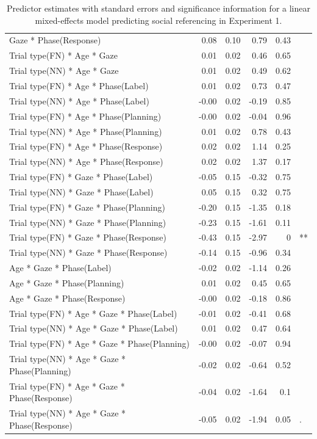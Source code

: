 \documentclass[a4paper,man,apacite,floatsintext]{apa6}
\begin{document}
\begin{table}[b]
\begin{tabular}{lrrrrl}
  Gaze * Phase(Response) & 0.08 & 0.10 & 0.79 & 0.43 &  \\ 
  Trial type(FN) * Age * Gaze & 0.01 & 0.02 & 0.46 & 0.65 &  \\ 
  Trial type(NN) * Age * Gaze & 0.01 & 0.02 & 0.49 & 0.62 &  \\ 
  Trial type(FN) * Age * Phase(Label) & 0.01 & 0.02 & 0.73 & 0.47 &  \\ 
  Trial type(NN) * Age * Phase(Label) & -0.00 & 0.02 & -0.19 & 0.85 &  \\ 
  Trial type(FN) * Age * Phase(Planning) & -0.00 & 0.02 & -0.04 & 0.96 &  \\ 
  Trial type(NN) * Age * Phase(Planning) & 0.01 & 0.02 & 0.78 & 0.43 &  \\ 
  Trial type(FN) * Age * Phase(Response) & 0.02 & 0.02 & 1.14 & 0.25 &  \\ 
  Trial type(NN) * Age * Phase(Response) & 0.02 & 0.02 & 1.37 & 0.17 &  \\ 
  Trial type(FN) * Gaze * Phase(Label) & -0.05 & 0.15 & -0.32 & 0.75 &  \\ 
  Trial type(NN) * Gaze * Phase(Label) & 0.05 & 0.15 & 0.32 & 0.75 &  \\ 
  Trial type(FN) * Gaze * Phase(Planning) & -0.20 & 0.15 & -1.35 & 0.18 &  \\ 
  Trial type(NN) * Gaze * Phase(Planning) & -0.23 & 0.15 & -1.61 & 0.11 &  \\ 
  Trial type(FN) * Gaze * Phase(Response) & -0.43 & 0.15 & -2.97 & 0 & ** \\ 
  Trial type(NN) * Gaze * Phase(Response) & -0.14 & 0.15 & -0.96 & 0.34 &  \\ 
  Age * Gaze * Phase(Label) & -0.02 & 0.02 & -1.14 & 0.26 &  \\ 
  Age * Gaze * Phase(Planning) & 0.01 & 0.02 & 0.45 & 0.65 &  \\ 
  Age * Gaze * Phase(Response) & -0.00 & 0.02 & -0.18 & 0.86 &  \\ 
  Trial type(FN) * Age * Gaze * Phase(Label) & -0.01 & 0.02 & -0.41 & 0.68 &  \\ 
  Trial type(NN) * Age * Gaze * Phase(Label) & 0.01 & 0.02 & 0.47 & 0.64 &  \\ 
  Trial type(FN) * Age * Gaze * Phase(Planning) & -0.00 & 0.02 & -0.07 & 0.94 &  \\ 
  Trial type(NN) * Age * Gaze * Phase(Planning) & -0.02 & 0.02 & -0.64 & 0.52 &  \\ 
  Trial type(FN) * Age * Gaze * Phase(Response) & -0.04 & 0.02 & -1.64 & 0.1 &  \\ 
  Trial type(NN) * Age * Gaze * Phase(Response) & -0.05 & 0.02 & -1.94 & 0.05 & . \\ 
   \hline
\end{tabular}
\caption{Predictor estimates with standard errors and significance information for a linear mixed-effects model predicting social referencing in Experiment 1.} 
\label{tab:exp2_reg}
\end{table}
\end{document}
